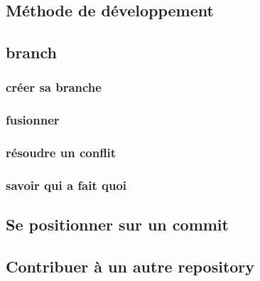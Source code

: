 \documentclass[a4paper,10pt]{article}
\begin{document}
  \subsection{Méthode de développement}
  \subsection{branch}
     \subsubsection{créer sa branche}
     \subsubsection{fusionner}
     \subsubsection{résoudre un conflit}
     \subsubsection{savoir qui a fait quoi}
  \subsection{Se positionner sur un commit}
  \subsection{Contribuer à un autre repository}
\end{document}
